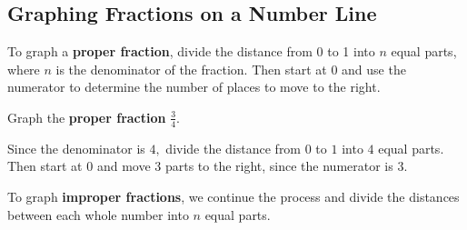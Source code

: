 \documentclass[handout, font=12pt]{ximera}
\begin{document}
\subsection*{Graphing Fractions on a Number Line}

To graph a \textbf{proper fraction}, divide the distance from 0 to 1 into $n$ equal parts, where $n$ is the denominator of the fraction.  Then start at 0 and use the numerator to determine the number of places to move to the right.

\begin{example}

Graph the \textbf{proper fraction} $\textstyle \frac{3}{4}.$ 

\begin{explanation}
  
Since the denominator is $4,$ divide the distance from $0$ to $1$ into $4$ equal parts.  Then start at $0$ and move $3$ parts to 
the right, since the numerator is $3.$

\begin{center}

\end{center}

\end{explanation}
\end{example}

To graph \textbf{improper fractions}, we continue the process and divide the distances between each whole number into $n$ equal parts.
\end{document}
